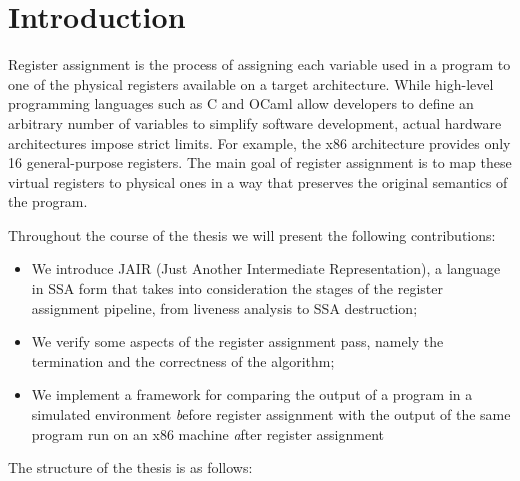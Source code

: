 
\chapter{Introduction}
\label{cha:intro}

Register assignment is the process of assigning each variable used in a program to one of the physical registers available on a target architecture. While high-level programming languages such as C and OCaml allow developers to define an arbitrary number of variables to simplify software development, actual hardware architectures impose strict limits. For example, the x86 architecture provides only 16 general-purpose registers. The main goal of register assignment is to map these virtual registers to physical ones in a way that preserves the original semantics of the program.

Throughout the course of the thesis we will present the following contributions:
\begin{itemize}
    \item We introduce JAIR (Just Another Intermediate Representation), a language in SSA form that takes into consideration the stages of the register assignment pipeline, from liveness analysis to SSA destruction;

    \item We verify some aspects of the register assignment pass, namely the termination and the {\color{red} correctness} of the algorithm;

    \item We implement a framework for comparing the output of a program in a simulated environment \textit before register assignment with the output of the same program run on an x86 machine \textit after register assignment
\end{itemize}

The structure of the thesis is as follows:


